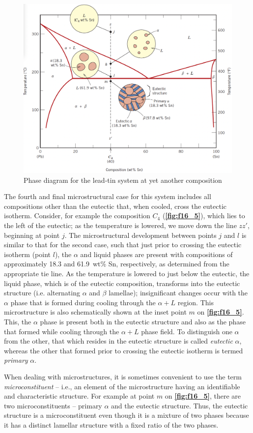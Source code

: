 \begin{figure} [ht]
  \centering
  \includegraphics[width=0.45\linewidth]{./figures/f16_5.png}
  \caption{Phase diagram for the lead-tin system at yet another composition}
  \label{fig:f16_5}
\end{figure}
The fourth and final microstructural case for this system includes all compositions other than the eutectic that, when cooled, cross the eutectic isotherm. Consider, for example the composition $C_4$ (\textbf{\autoref{fig:f16_5}}), which lies to the left of the eutectic; as the temperature is lowered, we move down the line $zz'$, beginning at point $j$. The microstructural development between points $j$ and $l$ is similar to that for the second case, such that just prior to crossing the eutectic isotherm (point $l$), the $\alpha$ and liquid phases are present with compositions of approximately \num{18,3} and \qty{61,9}{wt}\% Sn, respectively, as determined from the appropriate tie line. As the temperature is lowered to just below the eutectic, the liquid phase, which is of the eutectic composition, transforms into the eutectic structure (i.e. alternating $\alpha$ and $\beta$ lamellae); insignificant changes occur with the $\alpha$ phase that is formed during cooling through the $\alpha + L$ region. This microstructure is also schematically shown at the inset point $m$ on \textbf{\autoref{fig:f16_5}}. This, the $\alpha$ phase is present both in the eutectic structure and also as the phase that formed while cooling through the $\alpha + L$ phase field. To distinguish one $\alpha$ from the other, that which resides in the eutectic structure is called \textit{eutectic} $\alpha$, whereas the other that formed prior to crossing the eutectic isotherm is termed \textit{primary} $\alpha$. 

When dealing with microstructures, it is sometimes convenient to use the term \textit{microconstituent} -- i.e., an element of the microstructure having an identifiable and characteristic structure. For example at point $m$ on \textbf{\autoref{fig:f16_5}}, there are two microconstituents -- primary $\alpha$ and the eutectic structure. Thus, the eutectic structure is a microconstituent even though it is a mixture of two phases because it has a distinct lamellar structure with a fixed ratio of the two phases.

